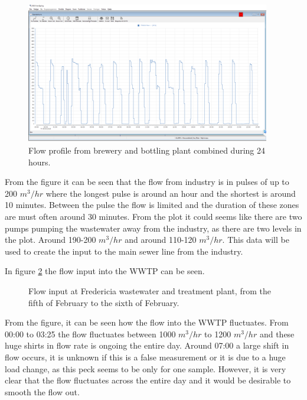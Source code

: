 \begin{figure}[H]
	\centering
	\includegraphics[width=0.95\textwidth]{report/system_overview/pictures/flow_profile_industry}
	\caption{Flow profile from brewery and bottling plant combined during 24 hours.}
	\label{fig:flow_profile_industry}
\end{figure}	

From the figure it can be seen that the flow from industry is in pulses of up to 200 $m^3/hr$ where the longest pulse is around an hour and the shortest is around 10 minutes. Between the pulse the flow is limited and the duration of these zones are must often around 30 minutes. From the plot it could seems like there are two pumps pumping the wastewater away from the industry, as there are two levels in the plot. Around 190-200 $m^3/hr$ and around 110-120 $m^3/hr$. This data will be used to create the input to the main sewer line from the industry.     

In figure \ref{fig:flow_input_wwtp} the flow input into the WWTP can be seen.
\begin{figure}[H]
\centering

\caption{Flow input at Fredericia wastewater and treatment plant, from the fifth of February to the sixth of February.}
\label{fig:flow_input_wwtp}
\end{figure}  

From the figure, it can be seen how the flow into the WWTP fluctuates. From 00:00 to 03:25 the flow fluctuates between 1000 $m^3/hr$ to 1200 $m^3/hr$ and these huge shirts in flow rate is ongoing the entire day. Around 07:00 a large shift in flow occurs, it is unknown if this is a false measurement or it is due to a huge load change, as this peck seems to be only for one sample. However, it is very clear that the flow fluctuates across the entire day and it would be desirable to smooth the flow out.    


